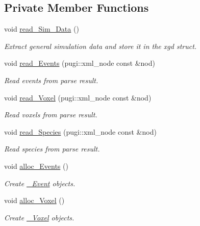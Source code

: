\subsection*{Private Member Functions}
\begin{DoxyCompactItemize}
\item 
void \hyperlink{classnw_1_1_standard___ipt_a0e29f3f6a4a01caa99d5ca151748be2c}{read\+\_\+\+Sim\+\_\+\+Data} ()
\begin{DoxyCompactList}\small\item\em Extract general simulation data and store it in the xgd struct. \end{DoxyCompactList}\item 
void \hyperlink{classnw_1_1_standard___ipt_ad23a7e58b69db65c74a9168fde457b19}{read\+\_\+\+Events} (pugi\+::xml\+\_\+node const \&nod)
\begin{DoxyCompactList}\small\item\em Read events from parse result. \end{DoxyCompactList}\item 
void \hyperlink{classnw_1_1_standard___ipt_a6024eab893f556075f463a685f2f28eb}{read\+\_\+\+Voxel} (pugi\+::xml\+\_\+node const \&nod)
\begin{DoxyCompactList}\small\item\em Read voxels from parse result. \end{DoxyCompactList}\item 
void \hyperlink{classnw_1_1_standard___ipt_a488e5aad95f3d66c6bfbb5f3e5daed3c}{read\+\_\+\+Species} (pugi\+::xml\+\_\+node const \&nod)
\begin{DoxyCompactList}\small\item\em Read species from parse result. \end{DoxyCompactList}\item 
void \hyperlink{classnw_1_1_standard___ipt_af38174edfc9d7be8bd9ee2c8bc6c4181}{alloc\+\_\+\+Events} ()
\begin{DoxyCompactList}\small\item\em Create \hyperlink{classnw_1_1___event}{\+\_\+\+Event} objects. \end{DoxyCompactList}\item 
void \hyperlink{classnw_1_1_standard___ipt_a0f07caf506c0610596e8b296955ac47a}{alloc\+\_\+\+Voxel} ()
\begin{DoxyCompactList}\small\item\em Create \hyperlink{classnw_1_1___voxel}{\+\_\+\+Voxel} objects. \end{DoxyCompactList}\item 

\end{DoxyCompactItemize}
